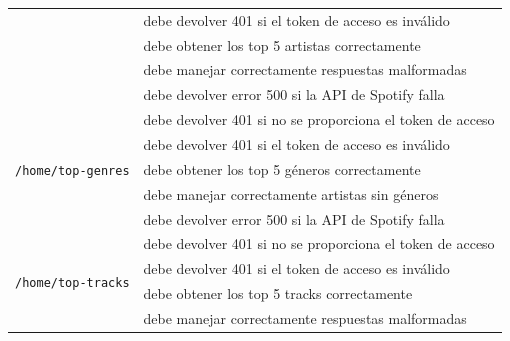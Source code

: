 \begin{longtable}{|p{5cm}|p{9cm}|}
                                                          & debe devolver 401 si el token de acceso es inválido                                      \\ \cline{2-2}
                                                          & debe obtener los top 5 artistas correctamente                                            \\ \cline{2-2}
                                                          & debe manejar correctamente respuestas malformadas                                        \\ \cline{2-2}
                                                          & debe devolver error 500 si la API de Spotify falla                                       \\ \hline
    \multirow{5}{*}{\texttt{/home/top-genres}}            & debe devolver 401 si no se proporciona el token de acceso                                \\ \cline{2-2}
                                                          & debe devolver 401 si el token de acceso es inválido                                      \\ \cline{2-2}
                                                          & debe obtener los top 5 géneros correctamente                                             \\ \cline{2-2}
                                                          & debe manejar correctamente artistas sin géneros                                          \\ \cline{2-2}
                                                          & debe devolver error 500 si la API de Spotify falla                                       \\ \hline
    \multirow{5}{*}{\texttt{/home/top-tracks}}            & debe devolver 401 si no se proporciona el token de acceso                                \\ \cline{2-2}
                                                          & debe devolver 401 si el token de acceso es inválido                                      \\ \cline{2-2}
                                                          & debe obtener los top 5 tracks correctamente                                              \\ \cline{2-2}
                                                          & debe manejar correctamente respuestas malformadas                                        \\ \cline{2-2}

\end{longtable}
